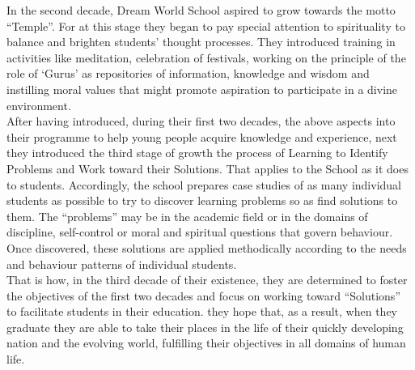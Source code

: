 In the second decade, Dream World School aspired to grow towards the motto “Temple”. For at this stage  they began to pay special attention to spirituality to balance and brighten students’ thought processes. They introduced training in activities like meditation, celebration of festivals, working on the principle of the role of ‘Gurus’ as repositories of information, knowledge and wisdom and instilling moral values that might promote aspiration to participate in a divine environment.\\

After having introduced, during their first two decades, the above aspects into their programme to help young people acquire knowledge and experience, next  they introduced the third stage of growth the process of Learning to Identify Problems and Work toward their Solutions. That applies to the School as it does to students. Accordingly, the school prepares case studies of as many individual students as possible to try to discover learning problems so as find solutions to them. The “problems” may be in the academic field or in the domains of discipline, self-control or moral and spiritual questions that govern behaviour. Once discovered, these solutions are applied methodically according to the needs and behaviour patterns of individual students.\\

 That is how, in the third decade of their existence,  they are determined to foster the objectives of the first two decades and focus on working toward “Solutions” to facilitate students in their education.  they hope that, as a result, when they graduate they are able to take their places in the life of their quickly developing nation and the evolving world, fulfilling their objectives in all domains of human life.\\
 
